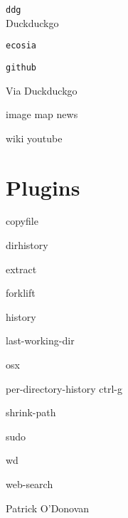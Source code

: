\documentclass[a4paper,landscape,columns=3]{cheatsheet}
\newcommand{\code}{\texttt}
\newcommand{\codequiv}{\dsm}
\begin{document}
\code{ddg}\\
Duckduckgo

\code{ecosia}

\code{github}

Via Duckduckgo

\ttfamily

image \qquad map \qquad news

wiki \qquad youtube

\columnbreak

\section{Plugins}

copyfile

dirhistory 

extract

forklift

history

last-working-dir

osx

per-directory-history {\codequiv{(}}ctrl-g{\codequiv{)}}

shrink-path

sudo

wd

web-search 

\columnbreak

\sffamily

Patrick O'Donovan\\
{}
\end{document}
